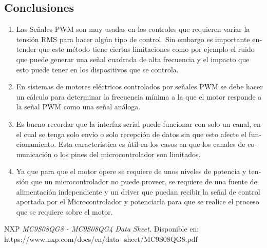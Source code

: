 \documentclass[journal]{IEEEtran}
\begin{document}
\begin{otherlanguage}{spanish}
\section{Conclusiones}
\begin{enumerate}
    \item Las Señales PWM son muy usadas en los controles que requieren variar la tensión RMS para hacer algún tipo de control. Sin embargo es importante entender que este método tiene ciertas limitaciones como por ejemplo el ruido que puede generar una señal cuadrada de alta frecuencia y el impacto que esto puede tener en los dispositivos que se controla.
    \item En sistemas de motores eléctricos controlados por señales PWM se debe hacer un cálculo para determinar la frecuencia mínima a la que el motor responde a la señal PWM como una señal análoga.
    \item Es bueno recordar que la interfaz serial puede funcionar con solo un canal, en el cual se tenga solo envío o solo recepción de datos sin que esto afecte el funcionamiento. Esta característica es útil en los casos en que los canales de comunicación o los pines del microcontrolador son limitados.
    \item Ya que para que el motor opere se requiere de unos niveles de potencia y tensión que un microcontrolador no puede proveer, se requiere de una fuente de alimentación independiente y un driver que puedan recibir la señal de control aportada por el Microcontrolador y potenciarla para que se realice el proceso que se requiere sobre el motor.
\end{enumerate}

\begin{thebibliography}{1ente,5}
     NXP
    \textit{MC9S08QG8 - MC9S08QG4 Data Sheet.}
    Disponible en: https://www.nxp.com/docs/en/data- sheet/MC9S08QG8.pdf
 
\end{thebibliography}
\end{otherlanguage}
\end{document}
